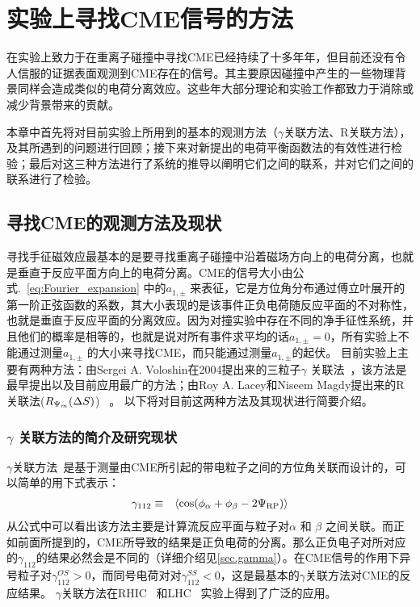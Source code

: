 
\setcounter{section}{0}

\setcounter{figure}{0}
\setcounter{table}{0}
\setcounter{equation}{0}



\chapter{实验上寻找CME信号的方法}

\bigskip

在实验上致力于在重离子碰撞中寻找CME已经持续了十多年年，但目前还没有令人信服的证据表面观测到CME存在的信号。其主要原因碰撞中产生的一些物理背景同样会造成类似的电荷分离效应。这些年大部分理论和实验工作都致力于消除或减少背景带来的贡献。

本章中首先将对目前实验上所用到的基本的观测方法（$\gamma$关联方法、R关联方法），及其所遇到的问题进行回顾；接下来对新提出的电荷平衡函数法的有效性进行检验；最后对这三种方法进行了系统的推导以阐明它们之间的联系，并对它们之间的联系进行了检验。


\section{寻找CME的观测方法及现状}

寻找手征磁效应最基本的是要寻找重离子碰撞中沿着磁场方向上的电荷分离，也就是垂直于反应平面方向上的电荷分离。CME的信号大小由公式.~\ref{eq:Fourier_expansion} 中的$a_{1,\pm}$ 来表征，它是方位角分布通过傅立叶展开的第一阶正弦函数的系数，其大小表现的是该事件正负电荷随反应平面的不对称性，也就是垂直于反应平面的分离效应。因为对撞实验中存在不同的净手征性系统，并且他们的概率是相等的，也就是说对所有事件求平均的话$a_{1,\pm}=0$，所有实验上不能通过测量$a_{1,\pm}$ 的大小来寻找CME，而只能通过测量$a_{1,\pm}$的起伏。
目前实验上主要有两种方法：由Sergei A. Voloshin在2004提出来的三粒子$\gamma$ 关联法~\cite{Voloshin:2008dg}，该方法是最早提出以及目前应用最广的方法；由Roy A. Lacey和Niseem Magdy提出来的R关联法($R_{{\rm \Psi}_m}(\Delta S)$)~\cite{RCorr-2011,RCorr-2018} 。
以下将对目前这两种方法及其现状进行简要介绍。

\subsection{ $\gamma$ 关联方法的简介及研究现状}

 $\gamma$关联方法~\cite{Voloshin:2008dg}是基于测量由CME所引起的带电粒子之间的方位角关联而设计的，可以简单的用下式表示：
\begin{eqnarray}
\gamma_{112} &\equiv&  \langle \cos(\phi_\alpha + \phi_\beta -2{\rm \Psi_{RP}}) \rangle \nonumber 
\end{eqnarray}
\noindent 从公式中可以看出该方法主要是计算流反应平面与粒子对$\alpha$ 和 $\beta$ 之间关联。而正如前面所提到的，CME所导致的结果是正负电荷的分离。那么正负电子对所对应的$\gamma_{112}$的结果必然会是不同的（详细介绍见\ref{sec.gamma}）。在CME信号的作用下异号粒子对$\gamma_{112}^{OS}>0$，而同号电荷对对$\gamma_{112}^{SS}<0$，这是最基本的$\gamma$关联方法对CME的反应结果。
 $\gamma$关联方法在RHIC~\cite{STAR1,Isobarauaustar,STAR3,STAR4,STAR5,TRIBEDY2017740,JieZhao} 和LHC~\cite{ALICE,CMS1,CMS2} 实验上得到了广泛的应用。
 
